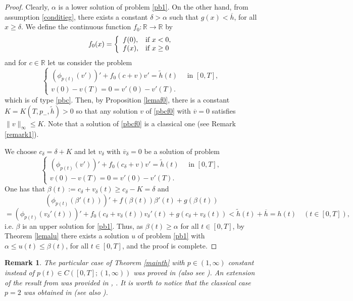 \documentclass[11pt]{amsart}
\newtheorem{remark}[theorem]{Remark}
\numberwithin{equation}{section} \textwidth=15.5cm
\begin{document}
\begin{proof}
Clearly, $\alpha$ is a lower solution of problem \eqref{pb1}. On the other hand, from assumption \eqref{conditieg}, there exists a constant $\delta>\alpha$ such that $g(x) <\overline{h}$, for all $x\geq\delta$. We define the continuous function $f_0:\mathbb{R}\to\mathbb{R}$ by
$$f_0(x)=\left\{
           \begin{array}{ll}
             f(0), & \hbox{if $x<0$,} \\
             f(x), & \hbox{if $x\geq 0$}
           \end{array}
         \right.
$$
and for $c\in\mathbb{R}$ let us consider the problem
\begin{equation}\label{pbcf0}
	\left \{
            \begin{array}{ll}
		      (\phi_{p(t)}(v'))'+f_0(c+v)v'=\tilde{h}(t)\quad \mbox{ in }[0,T],\\
		      v(0)-v(T)=0=v'(0)-v'(T).
			\end{array}
\right.
\end{equation}
which is of type \eqref{pbc}. Then, by Proposition \ref{lemaf0}, there is a constant $K=K(T,p_-,\tilde{h})>0$ so that any solution $v$ of \eqref{pbcf0} with $\overline{v}=0$ satisfies $\|v\|_\infty\leq K$. Note that a solution of \eqref{pbcf0} is a classical one (see Remark \ref{remark1}).

We choose $c_\delta=\delta+K$ and let $v_\delta$ with $\overline{v}_\delta=0$ be a solution of problem
\begin{equation*}
	\left \{
            \begin{array}{ll}
		      (\phi_{p(t)}(v'))'+f_0(c_\delta+v)v'=\tilde{h}(t)\quad \mbox{ in }[0,T],\\
		      v(0)-v(T)=0=v'(0)-v'(T).
			\end{array}
\right.
\end{equation*}
One has that $\beta(t):=c_\delta+v_\delta(t)\geq c_\delta-K=\delta$ and
$$(\phi_{p(t)}(\beta'(t)))'+f(\beta(t))\beta'(t)+g(\beta(t))$$
$$= (\phi_{p(t)}(v_\delta'(t)))'+f_0(c_\delta+v_\delta(t))v_\delta'(t)+g(c_\delta+v_\delta(t))<\tilde{h}(t)+\overline{h}=h(t)\quad (t\in[0,T]),$$
i.e. $\beta$ is an upper solution for \eqref{pb1}. Thus, as $\beta(t)\geq\alpha$ for all $t\in [0,T]$, by Theorem \ref{lemalu} there exists
 a solution $u$ of problem \eqref{pb1} with $\alpha\leq u(t)\leq\beta(t)$, for all $t\in[0,T]$,  and the proof is complete.
\end{proof}
\smallskip

\begin{remark}\label{remMJM1}\emph{The particular case of Theorem \ref{mainth} with $p\in (1, \infty)$ constant instead of  $p(t) \in C\left([0,T];(1,\infty)\right)$ was proved in \cite[Theorem 1]{[JMANS]} (also see \cite[Theorem 1]{[JMVJM]}). An extension of the result from \cite{[JMANS]} was provided in \cite[Theorem 2.3]{[RaT3]}, \cite[Theorem 8.21]{[RaStTv]}.
It is worth to notice that the classical case $p=2$ was obtained in \cite[Theorem 1]{[HaSa]} (see also \cite[Theorem 6.1]{[Maw93]}). }
\end{remark}
\medskip
\end{document}
